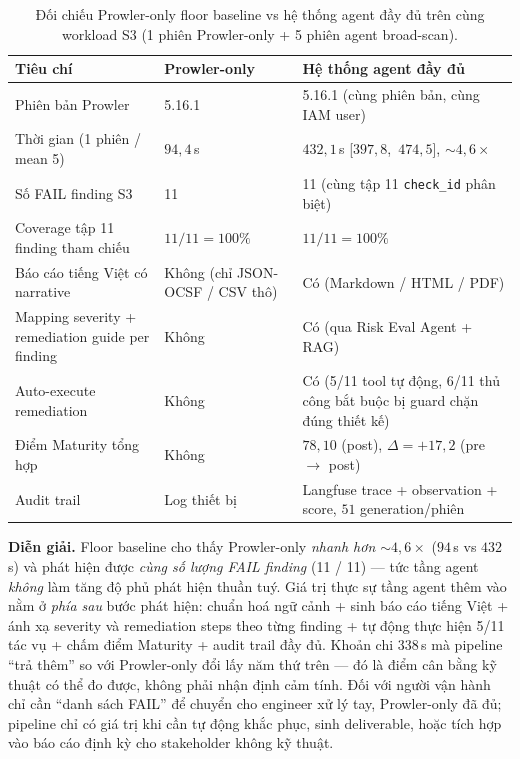 \begin{table}[!htb]
  \centering
  \caption{Đối chiếu Prowler-only floor baseline vs hệ thống agent đầy đủ trên cùng workload S3 (1 phiên Prowler-only + 5 phiên agent broad-scan).}
  \label{tab:prowler_floor}
  \small
  \begin{tabular}{p{4.7cm}p{3.4cm}p{6cm}}
    \toprule
    \textbf{Tiêu chí} & \textbf{Prowler-only} & \textbf{Hệ thống agent đầy đủ} \\
    \midrule
    Phiên bản Prowler              & 5.16.1                & 5.16.1 (cùng phiên bản, cùng IAM user) \\
    \addlinespace
    Thời gian (1 phiên / mean 5)   & $94{,}4$\,s           & $432{,}1$\,s \mbox{[$397{,}8$, $474{,}5$]}, $\sim 4{,}6\times$ \\
    \addlinespace
    Số FAIL finding S3              & 11                    & 11 (cùng tập 11 \texttt{check\_id} phân biệt) \\
    \addlinespace
    Coverage tập 11 finding tham chiếu & $11/11 = 100\%$       & $11/11 = 100\%$ \\
    \addlinespace
    Báo cáo tiếng Việt có narrative & Không (chỉ JSON-OCSF / CSV thô) & Có (Markdown / HTML / PDF) \\
    \addlinespace
    Mapping severity + remediation guide per finding & Không  & Có (qua Risk Eval Agent + RAG) \\
    \addlinespace
    Auto-execute remediation        & Không                  & Có (5/11 tool tự động, 6/11 thủ công bắt buộc bị guard chặn đúng thiết kế) \\
    \addlinespace
    Điểm Maturity tổng hợp          & Không                  & $78{,}10$ (post), $\Delta = +17{,}2$ (pre $\rightarrow$ post) \\
    \addlinespace
    Audit trail                     & Log thiết bị            & Langfuse trace + observation + score, $51$ generation/phiên \\
    \bottomrule
  \end{tabular}
\end{table}

\textbf{Diễn giải.} Floor baseline cho thấy Prowler-only \emph{nhanh hơn $\sim 4{,}6\times$} ($94$\,s vs $432$\,s) và phát hiện được \emph{cùng số lượng FAIL finding} (11 / 11) --- tức tầng agent \emph{không} làm tăng độ phủ phát hiện thuần tuý. Giá trị thực sự tầng agent thêm vào nằm ở \emph{phía sau} bước phát hiện: chuẩn hoá ngữ cảnh + sinh báo cáo tiếng Việt + ánh xạ severity và remediation steps theo từng finding + tự động thực hiện 5/11 tác vụ + chấm điểm Maturity + audit trail đầy đủ. Khoản chi $338$\,s mà pipeline ``trả thêm'' so với Prowler-only đổi lấy năm thứ trên --- đó là điểm cân bằng kỹ thuật có thể đo được, không phải nhận định cảm tính. Đối với người vận hành chỉ cần ``danh sách FAIL'' để chuyển cho engineer xử lý tay, Prowler-only đã đủ; pipeline chỉ có giá trị khi cần tự động khắc phục, sinh deliverable, hoặc tích hợp vào báo cáo định kỳ cho stakeholder không kỹ thuật.

